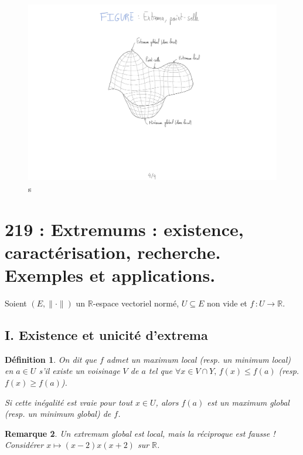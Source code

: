 \documentclass[10pt, a4paper, parskip=full, twoside, twocolumn]{report}
\newtheorem{definition}{Définition}
\newtheorem{remark}[definition]{Remarque}
\newcommand{\IR}{\mathbb{R}}
\begin{document}
\begin{figure}[!htb]
	\centering
	\includegraphics[trim={0 0 0 0},clip,width=1\linewidth]{img/215.pdf}
	\caption{s}
\end{figure}


\chapter*{219 : Extremums : existence, caractérisation, recherche. Exemples et applications.}
\setcounter{definition}{0}

\textcolor{paragraphtext}{Soient $(E,\|\cdot\|)$ un $\IR$-espace vectoriel normé, $U\subseteq E$ non vide et $f\,\colon U\to \IR$.}

\section*{I. Existence et unicité d'extrema}
\begin{definition}
	On dit que $f$ admet un \emph{maximum local} (resp. un \emph{minimum local}) en $a\in U$ s'il existe un voisinage $V$ de $a$ tel que $\forall x\in V\cap Y,\, f(x)\leq f(a)$ (resp. $f(x) \geq f(a)$).

	Si cette inégalité est vraie pour tout $x\in U$, alors $f(a)$ est un \emph{maximum global} (resp. un \emph{minimum global}) de $f$.
\end{definition}

\begin{remark}
	Un extremum global est local, mais la réciproque est fausse ! Considérer $x\mapsto (x-2)x(x+2)$ sur $\IR$.
\end{remark}
\end{document}
